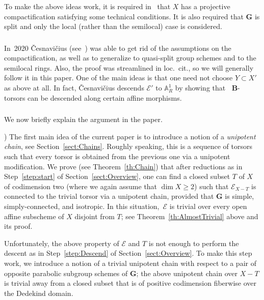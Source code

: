 \documentclass[11pt]{amsart}
\newcommand\A{\mathbb A}
\DeclareMathOperator\Ru{R_u}
\newcounter{noindnum}[subsection]
\renewcommand{\thenoindnum}{\alph{noindnum}}
\newcommand{\noindstep}{\refstepcounter{noindnum}{\rm(}\thenoindnum\/{\rm)} }
\theoremstyle{plain}
\theoremstyle{definition}
\theoremstyle{remark}
\newcommand\cE{{\mathcal{E}}}
\newcommand\bB{{\mathbf B}}
\newcommand\bG{{\mathbf G}}
\begin{document}
To make the above ideas work, it is required in~\cite{FedorovMixedChar} that $X$ has a projective compactification satisfying some technical conditions. It is also required that $\bG$ is split and only the local (rather than the semilocal) case is considered.

\subsubsection{} In~2020 \v{C}esnavi\v{c}ius (see~\cite{CesnaviciusGrSerre}) was able to get rid of the assumptions on the compactification, as well as to generalize to quasi-split group schemes and to the semilocal rings. Also, the proof was streamlined in loc.~cit., so we will generally follow it in this paper. One of the main ideas is that one need not choose $Y\subset X'$ as above at all. In fact, \v{C}esnavi\v{c}ius descends $\cE'$ to $\A^1_R$ by showing that $\Ru\bB$-torsors can be descended along certain affine morphisms.

\subsubsection{} We now briefly explain the argument in the paper.

\noindstep The first main idea of the current paper is to introduce a notion of a \emph{unipotent chain}, see Section~\ref{sect:Chains}. Roughly speaking, this is a sequence of torsors such that every torsor is obtained from the previous one via a unipotent modification. We prove (see Theorem~\ref{th:Chain}) that after reductions as in  Step~\eqref{step:start} of Section~\ref{sect:Overview}, one can find a closed subset $T$ of $X$ of codimension two (where we again assume that $\dim X\ge2$) such that $\cE_{X-T}$ is connected to the trivial torsor via a unipotent chain, provided that $\bG$ is simple, simply-connected, and isotropic. In this situation,~$\cE$ is trivial over every open affine subscheme of $X$ disjoint from $T$; see Theorem~\ref{th:AlmostTrivial} above and its proof.

Unfortunately, the above property of $\cE$ and $T$ is not enough to perform the descent as in Step~\eqref{step:Descend} of Section~\ref{sect:Overview}. To make this step work, we introduce a notion of a trivial unipotent chain with respect to a pair of opposite parabolic subgroup schemes of $\bG$; the above unipotent chain over $X-T$ is trivial away from a closed subset that is of positive codimension fiberwise over the Dedekind domain.
\end{document}

